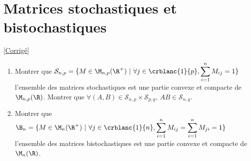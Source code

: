 \documentclass{book}
\begin{document}
\section{Matrices stochastiques et bistochastiques}
\label{Matrices stochastiques et bistochatiques}
\label{Matrices stochastiques}
\textcolor{blue}{\hyperref[sec:matrices-stochastiques-et-bistochastiques]{[Corrigé]}}\\
\begin{enumerate}[leftmargin=*]
	\item Montrer que $\mathcal S_{n,p}=\{M\in \M_{n,p}(\R^+)\ |\ \forall j\in \crblanc{1}{p},\displaystyle\sum\limits_{i=1}^n{M_{ij}}=1\}$ l'ensemble des matrices stochastiques est une partie convexe et compacte de $\M_{n,p}(\R)$. Montrer que $\forall (A,B)\in \mathcal S_{n,p}\times\mathcal S_{p,q},\ AB\in \mathcal S_{n,q}$.
	\item Montrer que $\B_n=\{M\in \M_n(\R^+)\ |\ \forall j\in \crblanc{1}{n},\displaystyle\sum\limits_{i=1}^n{M_{ij}}=\displaystyle\sum\limits_{i=1}^n{M_{ji}}=1\}$ l'ensemble des matrices bistochastiques est une partie convexe et compacte de $\M_n(\R)$.
\end{enumerate}
\end{document}
